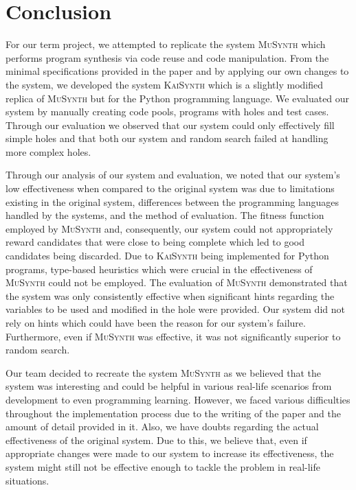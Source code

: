 \documentclass{article}
\begin{document}
\section{Conclusion}

For our term project, we attempted to replicate the system \textsc{MuSynth} which performs program synthesis via code reuse and code manipulation. From the minimal specifications provided in the paper and by applying our own changes to the system, we developed the system \textsc{KaiSynth} which is a slightly modified replica of \textsc{MuSynth} but for the Python programming language. We evaluated our system by manually creating code pools, programs with holes and test cases. Through our evaluation we observed that our system could only effectively fill simple holes and that both our system and random search failed at handling more complex holes. 

Through our analysis of our system and evaluation, we noted that our system's low effectiveness when compared to the original system was due to limitations existing in the original system, differences between the programming languages handled by the systems, and the method of evaluation. The fitness function employed by \textsc{MuSynth} and, consequently, our system could not appropriately reward candidates that were close to being complete which led to good candidates being discarded. Due to \textsc{KaiSynth} being implemented for Python programs, type-based heuristics which were crucial in the effectiveness of \textsc{MuSynth} could not be employed. The evaluation of \textsc{MuSynth} demonstrated that the system was only consistently effective when significant hints regarding the variables to be used and modified in the hole were provided. Our system did not rely on hints which could have been the reason for our system's failure. Furthermore, even if \textsc{MuSynth} was effective, it was not significantly superior to random search.

Our team decided to recreate the system \textsc{MuSynth} as we believed that the system was interesting and could be helpful in various real-life scenarios from development to even programming learning. However, we faced various difficulties throughout the implementation process due to the writing of the paper and the amount of detail provided in it. Also, we have doubts regarding the actual effectiveness of the original system. Due to this, we believe that, even if appropriate changes were made to our system to increase its effectiveness, the system might still not be effective enough to tackle the problem in real-life situations. 
\end{document}
